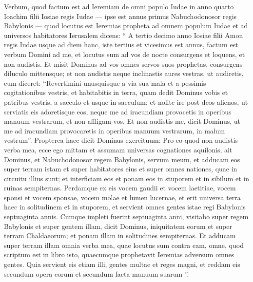 \begin{biblechapter}
\begin{biblechapter}
\begin{biblechapter}
\begin{biblechapter}
\begin{biblechapter}
\begin{biblechapter}
\begin{biblechapter}
\begin{biblechapter}
\begin{biblechapter}
\begin{biblechapter}
\begin{biblechapter}
\begin{biblechapter}
\begin{biblechapter}
\begin{biblechapter}
\begin{biblechapter}
\begin{biblechapter}
\begin{biblechapter}
\begin{biblechapter}
\begin{biblechapter}
\begin{biblechapter}
\begin{biblechapter}
\begin{biblechapter}
\begin{biblechapter}
\begin{biblechapter}
\begin{biblechapter}
\verse Verbum, quod factum est ad Ieremiam de omni populo Iudae in anno quarto Ioachim filii Iosiae regis Iudae — ipse est annus primus Nabuchodonosor regis Babylonis — 
\verse quod locutus est Ieremias propheta ad omnem populum Iudae et ad universos habitatores Ierusalem dicens:
 \verse “ A tertio decimo anno Iosiae filii Amon regis Iudae usque ad diem hanc, iste tertius et vicesimus est annus, factum est verbum Domini ad me, et locutus sum ad vos de nocte consurgens et loquens, et non audistis. 
\verse Et misit Dominus ad vos omnes servos suos prophetas, consurgens diluculo mittensque; et non audistis neque inclinastis aures vestras, ut audiretis, 
\verse cum diceret: “Revertimini unusquisque a via sua mala et a pessimis cogitationibus vestris, et habitabitis in terra, quam dedit Dominus vobis et patribus vestris, a saeculo et usque in saeculum; 
\verse et nolite ire post deos alienos, ut serviatis eis adoretisque eos, neque me ad iracundiam provocetis in operibus manuum vestrarum, et non affligam vos. 
\verse Et non audistis me, dicit Dominus, ut me ad iracundiam provocaretis in operibus manuum vestrarum, in malum vestrum”.
 \verse Propterea haec dicit Dominus exercituum: Pro eo quod non audistis verba mea, 
 \verse ecce ego mittam et assumam universas cognationes aquilonis, ait Dominus, et Nabuchodonosor regem Babylonis, servum meum, et adducam eos super terram istam et super habitatores eius et super omnes nationes, quae in circuitu illius sunt; et interficiam eos et ponam eos in stuporem et in sibilum et in ruinas sempiternas. 
\verse Perdamque ex eis vocem gaudii et vocem laetitiae, vocem sponsi et vocem sponsae, vocem molae et lumen lucernae, 
\verse et erit universa terra haec in solitudinem et in stuporem, et servient omnes gentes istae regi Babylonis septuaginta annis. 
\verse Cumque impleti fuerint septuaginta anni, visitabo super regem Babylonis et super gentem illam, dicit Dominus, iniquitatem eorum et super terram Chaldaeorum; et ponam illam in solitudines sempiternas. 
 \verse Et adducam super terram illam omnia verba mea, quae locutus sum contra eam, omne, quod scriptum est in libro isto, quaecumque prophetavit Ieremias adversum omnes gentes. 
\verse Quia servient eis etiam illi, gentes multae et reges magni, et reddam eis secundum opera eorum et secundum facta manuum suarum ”.

\end{biblechapter}
\end{biblechapter}
\end{biblechapter}
\end{biblechapter}
\end{biblechapter}
\end{biblechapter}
\end{biblechapter}
\end{biblechapter}
\end{biblechapter}
\end{biblechapter}
\end{biblechapter}
\end{biblechapter}
\end{biblechapter}
\end{biblechapter}
\end{biblechapter}
\end{biblechapter}
\end{biblechapter}
\end{biblechapter}
\end{biblechapter}
\end{biblechapter}
\end{biblechapter}
\end{biblechapter}
\end{biblechapter}
\end{biblechapter}
\end{biblechapter}
